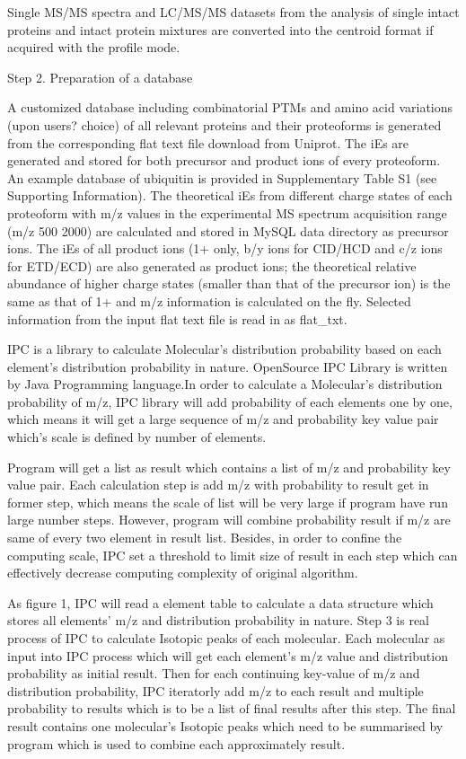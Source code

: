 \documentclass[letterpaper,twocolumn,10pt]{article}
\begin{document}
Single MS/MS spectra and LC/MS/MS datasets from the analysis of single intact proteins and intact protein mixtures are converted into the centroid format if acquired with the profile mode.

Step 2. Preparation of a database

A customized database including combinatorial PTMs and amino acid variations (upon users? choice) of all relevant proteins and their proteoforms is generated from the corresponding flat text file download from Uniprot. The iEs are generated and stored for both precursor and product ions of every proteoform. An example database of ubiquitin is provided in Supplementary Table S1 (see Supporting Information). The theoretical iEs from different charge states of each proteoform with m/z values in the experimental MS spectrum acquisition range (m/z 500 2000) are calculated and stored in MySQL data directory as precursor ions. The iEs of all product ions (1+ only, b/y ions for CID/HCD and c/z ions for ETD/ECD) are also generated as product ions; the theoretical relative abundance of higher charge states (smaller than that of the precursor ion) is the same as that of 1+ and m/z information is calculated on the fly. Selected information from the input flat text file is read in as flat_txt.

IPC is a library to calculate Molecular's distribution probability based on each element's distribution probability in nature. OpenSource IPC Library is written by Java Programming language.In order to calculate a Molecular's distribution probability of m/z, IPC library will add probability of each elements one by one, which means it will get a large sequence of  m/z and probability  key value pair which's scale is defined by number of elements.

Program will get a list as result which contains a list of m/z and probability key value pair. Each calculation step is add m/z with probability to result get in former step, which means the scale of list will be very large if program have run large number steps. However, program will combine probability result if m/z are same of every two element in result list. Besides, in order to confine the computing scale, IPC set a threshold to limit size of result in each step which can effectively decrease computing complexity of original algorithm.

As figure 1, IPC will read a element table to calculate a data structure which stores all elements' m/z and distribution probability in nature. Step 3 is real process of IPC to calculate Isotopic peaks of each molecular. Each molecular as input into IPC process which will get each element's m/z value and distribution probability as initial result. Then for each continuing key-value of m/z and distribution probability, IPC iteratorly add m/z to each result and multiple probability to results which is to be a  list of final results after this step.  The final result contains  one molecular's Isotopic peaks which need to be summarised by program which is used to combine each approximately result. 
\end{document}
